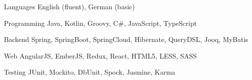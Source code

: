 

\begin{cvskills}
  \cvskill
    {Languages} %
    {English (fluent), German (basic)} %

  \cvskill
    {Programming} %
    {Java, Kotlin, Groovy, C\#, JavaScript, TypeScript} %

  \cvskill
    {Backend} %
    {Spring, SpringBoot, SpringCloud, Hibernate, QueryDSL, Jooq, MyBatis} %

  \cvskill
    {Web} %
    {AngularJS, EmberJS, Redux, React, HTML5, LESS, SASS} %

  \cvskill
    {Testing} %
    {JUnit, Mockito, DbUnit, Spock, Jasmine, Karma} %
\end{cvskills}
